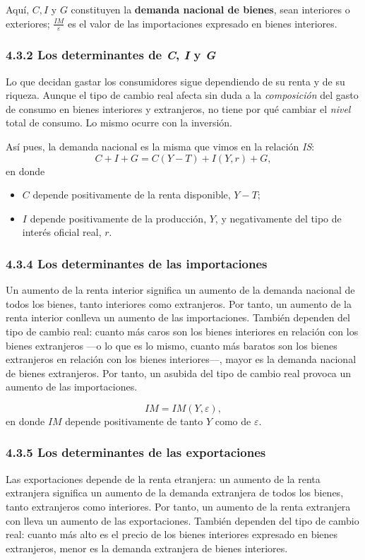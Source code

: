 \documentclass[10pt, landscape]{article}
\begin{document}
\begin{multicols*}{3}
Aquí, $C, I$ y $G$ constituyen la \textbf{demanda nacional de bienes}, sean interiores o exteriores; $\frac{IM}{\varepsilon}$ es el valor de las importaciones expresado en bienes interiores.

\subsubsection{4.3.2 Los determinantes de \textit{C}, \textit{I} y \textit{G}}
Lo que decidan gastar los consumidores sigue dependiendo de su renta y de su riqueza. Aunque el tipo de cambio real afecta sin duda a la \textit{composición} del gasto de consumo en bienes interiores y extranjeros, no tiene por qué cambiar el \textit{nivel} total de consumo. Lo mismo ocurre con la inversión. 

Así pues, la demanda nacional es la misma que vimos en la relación \textit{IS}:
\[ C+I+G = C(Y-T) + I(Y,r) + G, \]
en donde
\begin{itemize}
    \item $C$ depende positivamente de la renta disponible, $Y-T$;
    \item $I$ depende positivamente de la producción, $Y$, y negativamente del tipo de interés oficial real, $r$.
\end{itemize}

\subsubsection{4.3.4 Los determinantes de las importaciones}
Un aumento de la renta interior significa un aumento de la demanda nacional de todos los bienes, tanto interiores como extranjeros. Por tanto, un aumento de la renta interior conlleva un aumento de las importaciones. También dependen del tipo de cambio real: cuanto más caros son los bienes interiores en relación con los bienes extranjeros —o lo que es lo mismo, cuanto más baratos son los bienes extranjeros en relación con los bienes interiores—, mayor es la demanda nacional de bienes extranjeros. Por tanto, un asubida del tipo de cambio real provoca un aumento de las importaciones.

\[ IM = IM(Y, \varepsilon),\]
en donde $IM$ depende positivamente de tanto $Y$ como de $\varepsilon$.

\subsubsection{4.3.5 Los determinantes de las exportaciones}
Las exportaciones depende de la renta etranjera: un aumento de la renta extranjera significa un aumento de la demanda extranjera de todos los bienes, tanto extranjeros como interiores. Por tanto, un aumento de la renta extranjera con lleva un aumento de las exportaciones. También dependen del tipo de cambio real: cuanto más alto es el precio de los bienes interiores expresado en bienes extranjeros, menor es la demanda extranjera de bienes interiores.


\end{multicols*}
\end{document}
